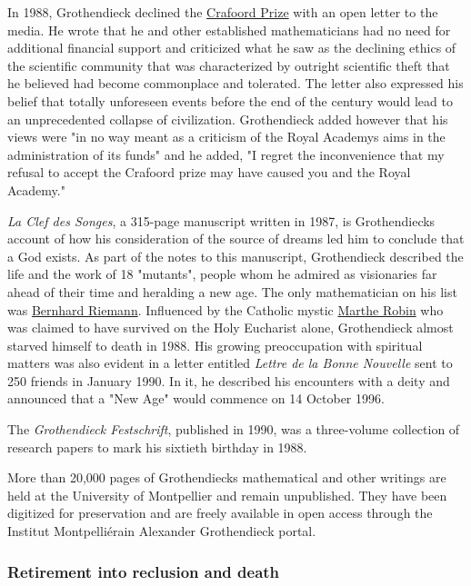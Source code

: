 In 1988, Grothendieck declined the \href{https://en.wikipedia.org/wiki/Crafoord_Prize}{Crafoord Prize} with an open letter to the media. He wrote that he and other established mathematicians had no need for additional financial support and criticized what he saw as the declining ethics of the scientific community that was characterized by outright scientific theft that he believed had become commonplace and tolerated. The letter also expressed his belief that totally unforeseen events before the end of the century would lead to an unprecedented collapse of civilization. Grothendieck added however that his views were "in no way meant as a criticism of the Royal Academy\textquotesingle s aims in the administration of its funds" and he added, "I regret the inconvenience that my refusal to accept the Crafoord prize may have caused you and the Royal Academy."

\emph{La Clef des Songes}, a 315-page manuscript written in 1987, is Grothendieck\textquotesingle s account of how his consideration of the source of dreams led him to conclude that a God exists. As part of the notes to this manuscript, Grothendieck described the life and the work of 18 "mutants", people whom he admired as visionaries far ahead of their time and heralding a new age. The only mathematician on his list was \href{https://en.wikipedia.org/wiki/Bernhard_Riemann}{Bernhard Riemann}. Influenced by the Catholic mystic \href{https://en.wikipedia.org/wiki/Marthe_Robin}{Marthe Robin} who was claimed to have survived on the Holy Eucharist alone, Grothendieck almost starved himself to death in 1988. His growing preoccupation with spiritual matters was also evident in a letter entitled \emph{Lettre de la Bonne Nouvelle} sent to 250 friends in January 1990. In it, he described his encounters with a deity and announced that a "New Age" would commence on 14 October 1996.

The \emph{Grothendieck Festschrift}, published in 1990, was a three-volume collection of research papers to mark his sixtieth birthday in 1988.

More than 20,000 pages of Grothendieck\textquotesingle s mathematical and other writings are held at the University of Montpellier and remain unpublished. They have been digitized for preservation and are freely available in open access through the Institut Montpelliérain Alexander Grothendieck portal.


\subsubsection{Retirement into reclusion and death}\label{Retirement_into_reclusion_and_death}

